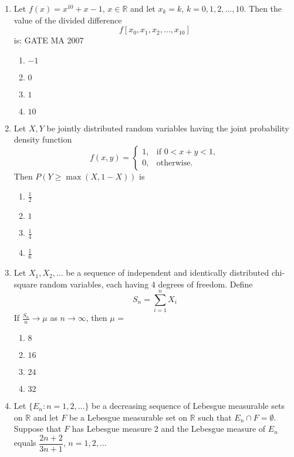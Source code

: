 \documentclass[journal]{IEEEtran}
\numberwithin{equation}{enumi}
\numberwithin{figure}{enumi}
\begin{document}
\begin{enumerate}
\item Let $f(x) = x^{10} + x - 1$, $x \in \mathbb{R}$ and let $x_k = k$, $k=0,1,2,\dots,10$. Then the value of the divided difference
\[
f[x_0, x_1, x_2, \dots, x_{10}]
\]
is:
\hfill{GATE MA 2007}
\begin{multicols}{4}
\begin{enumerate}
    \item $-1$
    \item $0$
    \item $1$
    \item $10$
\end{enumerate}
\end{multicols}
 

\item  Let $X, Y$ be jointly distributed random variables having the joint probability density function
\[
f(x,y) = \begin{cases}
1, & \text{if } 0 < x + y < 1, \\
0, & \text{otherwise.}
\end{cases}
\]
Then $P(Y \ge \max(X, 1 - X))$ is
\hfill{}

\begin{multicols}{4}
\begin{enumerate}
    \item $\tfrac{1}{2}$
    \item $1$
    \item $\tfrac{1}{4}$
    \item $\tfrac{1}{6}$
\end{enumerate}
\end{multicols}


\item Let $X_1, X_2, \dots$ be a sequence of independent and identically distributed chi-square random variables, each having 4 degrees of freedom. Define
\[
S_n = \sum_{i=1}^n X_i
\]
If $\frac{S_n}{n} \to \mu$ as $n \to \infty$, then $\mu$ =
\hfill{}
\begin{multicols}{4}
\begin{enumerate}
    \item $8$
    \item $16$
    \item $24$
    \item $32$
\end{enumerate}
\end{multicols}
 


\item  Let $\{E_n : n = 1, 2, \dots\}$ be a decreasing sequence of Lebesgue measurable sets on $\mathbb{R}$ and let $F$ be a Lebesgue measurable set on $\mathbb{R}$ such that $E_n \cap F = \emptyset$. Suppose that $F$ has Lebesgue measure 2 and the Lebesgue measure of $E_n$ equals $\dfrac{2n + 2}{3n + 1}$, $n = 1, 2, \dots$\\


\end{enumerate}
\end{document}
